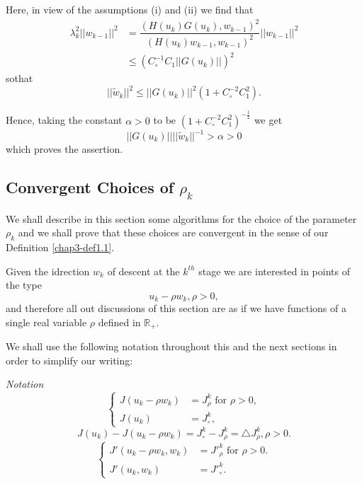 Here, in view of the assumptions (i) and (ii) we find that
\begin{align*}
\lambda_{k}^{2} ||w_{k-1}||^{2} & = \dfrac{(H(u_{k})G(u_{k}), w_{k-1})^{2}}{(H(u_{k})w_{k-1}, w_{k-1})^{2}} ||w_{k-1}||^{2}\\
& \leq (C_{\circ}^{-1} C_{1} ||G(u_{k})||)^{2}
\end{align*}
so\pageoriginale that
$$
||\widetilde{w}_{k}||^{2} \leq ||G(u_{k})||^{2} (1 + C_{\circ}^{-2} C_{1}^{2}).
$$

Hence, taking the constant $\alpha > 0$ to be $(1 + C_{\circ}^{-2} C_{1}^{2})^{-\frac{1}{2}}$ we get
$$
||G(u_{k})|| ||\widetilde{w}_{k}||^{-1}  > \alpha > 0
$$
which proves the assertion.

\subsection{Convergent Choices of $\rho_{k}$}\label{chap3-subsec1.3}
We shall describe in this section some algorithms for the choice of the parameter $\rho_{k}$ and we shall prove that these choices are convergent in the sense of our Definition \ref{chap3-def1.1}.

Given the idrection $w_{k}$ of descent at the $k^{th}$ stage we are interested in points of the type
$$
u_{k} - \rho w_{k}, \rho > 0,
$$
and therefore all out discussions of this section are as if we have functions of a single real variable $\rho$ defined in $\mathbb{R}_{+}$.

We shall use the following notation throughout this and the next sections in order to simplify our writing:

{\em Notation}
\begin{equation*}
\begin{cases}
J(u_{k} - \rho w_{k}) & = J_{\rho}^{k} \text{ for } \rho > 0,\\
J(u_{k}) & = J_{\circ}^{k},
\end{cases}
\end{equation*}
$$
J(u_{k}) - J(u_{k} - \rho w_{k}) = J_{\circ}^{k} - J_{\rho}^{k} = \triangle J_{\rho}^{k}, \rho > 0.
$$
\begin{equation*}
\begin{cases}
 J'(u_{k} - \rho w_{k}, w_{k}) & = {J'}_{\rho}^{k} \text{ for } \rho > 0.\\
J'(u_{k}, w_{k}) & = {J'}_{\circ}^{k}.
\end{cases}
\end{equation*}


